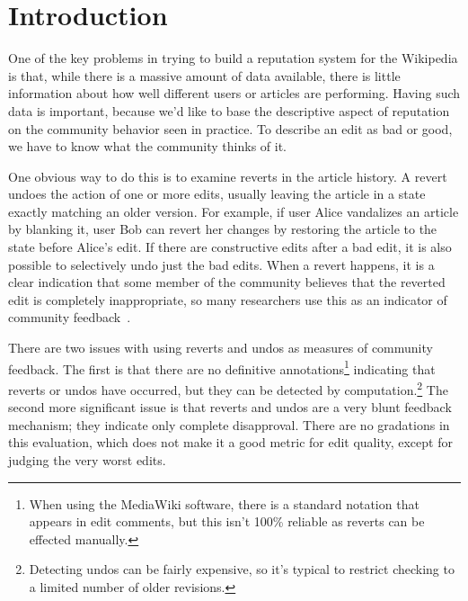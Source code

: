 \section{Introduction}

One of the key problems in trying to build a reputation system
for the Wikipedia is that, while there is a massive amount of
data available, there is little information about how well different
users or articles are performing.
Having such data is important, because we'd like to base the
descriptive aspect of reputation on the community behavior seen
in practice.
To describe an edit as bad or good, we have to know what the
community thinks of it.

One obvious way to do this is to examine reverts
in the article history.
A revert undoes the action of one or more edits, usually leaving
the article in a state exactly matching an older version.
For example, if user Alice vandalizes an article by blanking it,
user Bob can revert her changes by restoring the article to the
state before Alice's edit.
If there are constructive edits after a bad edit, it is also possible
to selectively undo just the bad edits.
When a revert happens, it is a clear indication that some member
of the community believes that the reverted edit is completely
inappropriate, so many researchers use this as an indicator of
community feedback~\cite{Adler2007,Smets2008,Itakura2009,Belani2010}.

There are two issues with using reverts and undos
as measures of community feedback.
The first is that there are no definitive
annotations\footnote{When using the MediaWiki software,
there is a standard notation that appears in edit comments,
but this isn't 100\% reliable as reverts can be effected manually.}
indicating that reverts or undos have occurred,
but they can be detected by
computation.\footnote{Detecting undos can be fairly expensive, so
it's typical to restrict checking to a limited number of older revisions.}
The second more significant issue is that reverts and undos
are a very blunt feedback mechanism; they indicate only complete disapproval.
There are no gradations in this evaluation, which does not make
it a good metric for edit quality, except for judging the very worst
edits.

